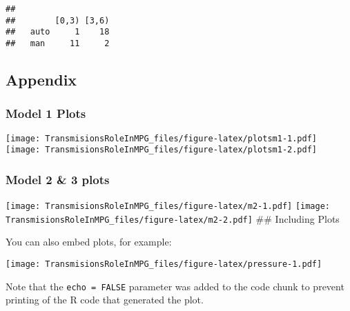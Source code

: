 \documentclass[
]{article}
\newenvironment{Shaded}{\begin{snugshade}}{\end{snugshade}}
\newcommand{\CommentTok}[1]{\textcolor[rgb]{0.56,0.35,0.01}{\textit{#1}}}
\newcommand{\KeywordTok}[1]{\textcolor[rgb]{0.13,0.29,0.53}{\textbf{#1}}}
\newcommand{\NormalTok}[1]{#1}
\newcommand{\OperatorTok}[1]{\textcolor[rgb]{0.81,0.36,0.00}{\textbf{#1}}}
\begin{document}
\begin{Shaded}
\end{Shaded}

\begin{verbatim}
##       
##        [0,3) [3,6)
##   auto     1    18
##   man     11     2
\end{verbatim}

\hypertarget{appendix}{%
\subsection{Appendix}\label{appendix}}

\hypertarget{model-1-plots}{%
\subsubsection{Model 1 Plots}\label{model-1-plots}}

\texttt{[image: TransmisionsRoleInMPG\_files/figure-latex/plotsm1-1.pdf]}
\texttt{[image: TransmisionsRoleInMPG\_files/figure-latex/plotsm1-2.pdf]}

\hypertarget{model-2-3-plots}{%
\subsubsection{Model 2 \& 3 plots}\label{model-2-3-plots}}

\texttt{[image: TransmisionsRoleInMPG\_files/figure-latex/m2-1.pdf]}
\texttt{[image: TransmisionsRoleInMPG\_files/figure-latex/m2-2.pdf]} \#\#
Including Plots

You can also embed plots, for example:

\texttt{[image: TransmisionsRoleInMPG\_files/figure-latex/pressure-1.pdf]}

Note that the \texttt{echo\ =\ FALSE} parameter was added to the code
chunk to prevent printing of the R code that generated the plot.
\end{document}
